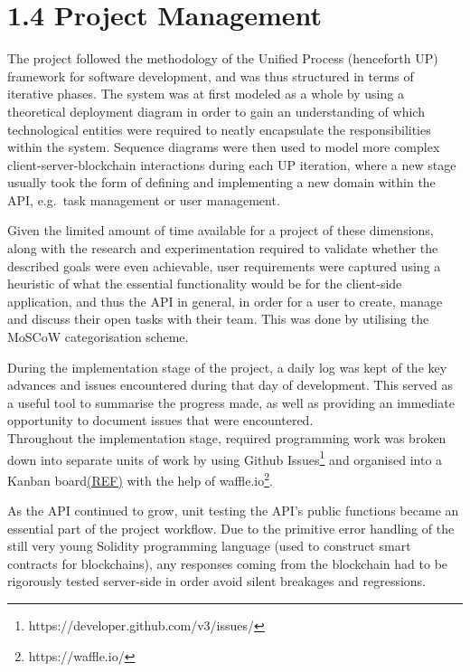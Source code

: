 \documentclass[12pt]{report}
\begin{document}
\section{1.4 Project Management}\label{project-management}

The project followed the methodology of the Unified Process (henceforth
UP) framework for software
development\cite{jacobson1999unified}, and was thus structured in terms of iterative
phases. The system was at first modeled as a whole by using a
theoretical deployment diagram in order to gain an understanding of
which technological entities were required to neatly encapsulate the
responsibilities within the system. Sequence diagrams were then used to
model more complex client-server-blockchain interactions during each UP
iteration, where a new stage usually took the form of defining and
implementing a new domain within the API, e.g.~task management or user
management.

Given the limited amount of time available for a project of these
dimensions, along with the research and experimentation required to
validate whether the described goals were even achievable, user
requirements were captured using a heuristic of what the essential
functionality would be for the client-side application, and thus the API
in general, in order for a user to create, manage and discuss their open
tasks with their team. This was done by utilising the MoSCoW
categorisation scheme\cite{1moscow}.

During the implementation stage of the project, a daily log was kept of the key advances and issues encountered during
that day of development. This served as a useful tool to summarise the
progress made, as well as providing an immediate opportunity to document
issues that were encountered.\\
Throughout the implementation stage, required programming work was
broken down into separate units of work by using Github
Issues\footnote{https://developer.github.com/v3/issues/} and organised into a Kanban board\href{}{(REF)}
with the help of waffle.io\footnote{https://waffle.io/}.

As the API continued to grow, unit testing the API's public functions became an
essential part of the project workflow. Due to the primitive error
handling of the still very young Solidity programming language (used to
construct smart contracts for blockchains), any responses coming from
the blockchain had to be rigorously tested server-side in order avoid
silent breakages and regressions.
\end{document}
